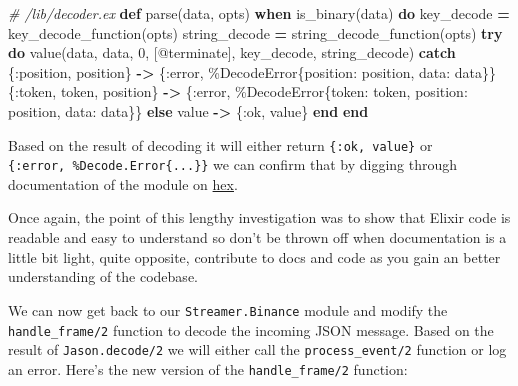 \documentclass[
  oneside]{book}
\newenvironment{Shaded}{\begin{snugshade}}{\end{snugshade}}
\newcommand{\CommentTok}[1]{\textcolor[rgb]{0.56,0.35,0.01}{\textit{#1}}}
\newcommand{\ConstantTok}[1]{\textcolor[rgb]{0.00,0.00,0.00}{#1}}
\newcommand{\ControlFlowTok}[1]{\textcolor[rgb]{0.13,0.29,0.53}{\textbf{#1}}}
\newcommand{\DecValTok}[1]{\textcolor[rgb]{0.00,0.00,0.81}{#1}}
\newcommand{\KeywordTok}[1]{\textcolor[rgb]{0.13,0.29,0.53}{\textbf{#1}}}
\newcommand{\NormalTok}[1]{#1}
\newcommand{\OperatorTok}[1]{\textcolor[rgb]{0.81,0.36,0.00}{\textbf{#1}}}
\newcommand{\OtherTok}[1]{\textcolor[rgb]{0.56,0.35,0.01}{#1}}
\newcommand{\VariableTok}[1]{\textcolor[rgb]{0.00,0.00,0.00}{#1}}
\begin{document}
\begin{Shaded}
\begin{Highlighting}[]
  \CommentTok{\# /lib/decoder.ex}
  \KeywordTok{def}\NormalTok{ parse(data, opts) }\KeywordTok{when}\NormalTok{ is\_binary(data) }\KeywordTok{do}
\NormalTok{    key\_decode }\OperatorTok{=}\NormalTok{ key\_decode\_function(opts)}
\NormalTok{    string\_decode }\OperatorTok{=}\NormalTok{ string\_decode\_function(opts)}
    \ControlFlowTok{try} \KeywordTok{do}
\NormalTok{      value(data, data, }\DecValTok{0}\NormalTok{, [}\OtherTok{@terminate}\NormalTok{], key\_decode, string\_decode)}
    \ControlFlowTok{catch}
\NormalTok{      \{}\VariableTok{:position}\NormalTok{, position\} }\OperatorTok{{-}\textgreater{}}
\NormalTok{        \{}\VariableTok{:error}\NormalTok{, \%}\ConstantTok{DecodeError}\NormalTok{\{}\VariableTok{position:}\NormalTok{ position, }\VariableTok{data:}\NormalTok{ data\}\}}
\NormalTok{      \{}\VariableTok{:token}\NormalTok{, token, position\} }\OperatorTok{{-}\textgreater{}}
\NormalTok{        \{}\VariableTok{:error}\NormalTok{, \%}\ConstantTok{DecodeError}\NormalTok{\{}\VariableTok{token:}\NormalTok{ token, }\VariableTok{position:}\NormalTok{ position, }\VariableTok{data:}\NormalTok{ data\}\}}
    \ControlFlowTok{else}
\NormalTok{      value }\OperatorTok{{-}\textgreater{}}
\NormalTok{        \{}\VariableTok{:ok}\NormalTok{, value\}}
    \KeywordTok{end}
  \KeywordTok{end}
\end{Highlighting}
\end{Shaded}

Based on the result of decoding it will either return \texttt{\{:ok,\ value\}} or \texttt{\{:error,\ \%Decode.Error\{...\}\}} we can confirm that by digging through documentation of the module on \href{https://hexdocs.pm/jason/Jason.html\#decode/2}{hex}.

Once again, the point of this lengthy investigation was to show that Elixir code is readable and easy to understand so don't be thrown off when documentation is a little bit light, quite opposite, contribute to docs and code as you gain an better understanding of the codebase.

We can now get back to our \texttt{Streamer.Binance} module and modify the \texttt{handle\_frame/2} function to decode the incoming JSON message. Based on the result of \texttt{Jason.decode/2} we will either call the \texttt{process\_event/2} function or log an error. Here's the new version of the \texttt{handle\_frame/2} function:
\end{document}

